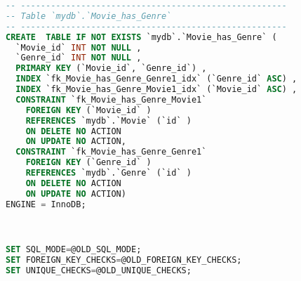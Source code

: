 \begin{lstlisting}[language=sql]
-- -----------------------------------------------------
-- Table `mydb`.`Movie_has_Genre`
-- -----------------------------------------------------
CREATE  TABLE IF NOT EXISTS `mydb`.`Movie_has_Genre` (
  `Movie_id` INT NOT NULL ,
  `Genre_id` INT NOT NULL ,
  PRIMARY KEY (`Movie_id`, `Genre_id`) ,
  INDEX `fk_Movie_has_Genre_Genre1_idx` (`Genre_id` ASC) ,
  INDEX `fk_Movie_has_Genre_Movie1_idx` (`Movie_id` ASC) ,
  CONSTRAINT `fk_Movie_has_Genre_Movie1`
    FOREIGN KEY (`Movie_id` )
    REFERENCES `mydb`.`Movie` (`id` )
    ON DELETE NO ACTION
    ON UPDATE NO ACTION,
  CONSTRAINT `fk_Movie_has_Genre_Genre1`
    FOREIGN KEY (`Genre_id` )
    REFERENCES `mydb`.`Genre` (`id` )
    ON DELETE NO ACTION
    ON UPDATE NO ACTION)
ENGINE = InnoDB;



SET SQL_MODE=@OLD_SQL_MODE;
SET FOREIGN_KEY_CHECKS=@OLD_FOREIGN_KEY_CHECKS;
SET UNIQUE_CHECKS=@OLD_UNIQUE_CHECKS;
\end{lstlisting}
\newpage